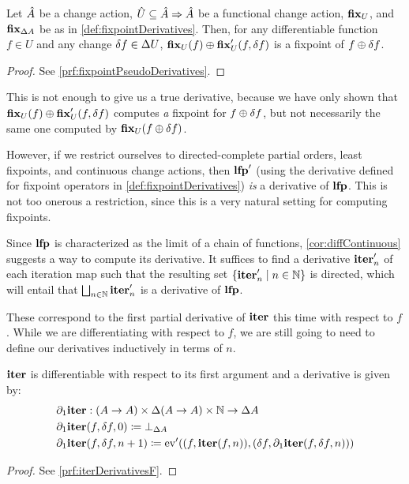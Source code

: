 \begin{thm}[name=Pseudo-derivatives of fixpoints, restate=fixpointPseudoDerivatives]
\label{thm:fixpointPseudoDerivatives}
  Let $\hat{A}$ be a change action, $\hat{U} \subseteq \hat{A} \Rightarrow
  \hat{A}$ be a functional change action, $\mathbf{fix}_{U}$, and 
  $\mathbf{fix}_{\Delta A}$ be as in \cref{def:fixpointDerivatives}. Then, for any
  differentiable function $f \in U$ and any change $\delta f \in \Delta U$,
  $\mathbf{fix}_U(f) \oplus \mathbf{fix}_U'(f, \delta f)$ is a fixpoint
  of $f \oplus \delta f$.
\end{thm}
\ifproofs
\begin{proof}
  See \cref{prf:fixpointPseudoDerivatives}.
\end{proof}
\fi

This is not enough to give us a true derivative, because we have only shown
that $\mathbf{fix}_U(f) \oplus \mathbf{fix}_U'(f, \delta f)$ computes \emph{a} 
fixpoint for $f \oplus \delta f$, but not necessarily
the same one computed by $\mathbf{fix}_U{(f \oplus \delta f)}$.

However, if we restrict ourselves to directed-complete partial orders, least
fixpoints, and continuous change actions, then $\mathbf{lfp}'$ (using the
derivative defined for fixpoint operators in \cref{def:fixpointDerivatives}) \emph{is} a
derivative of $\mathbf{lfp}$. This is not too onerous a restriction, since this is
a very natural setting for computing fixpoints.

Since $\mathbf{lfp}$ is characterized as the limit of a chain of functions,
\cref{cor:diffContinuous} suggests a way to compute its derivative. It suffices to find a derivative
$\mathbf{iter}_n'$ of each iteration map 
such that the resulting set $\{ \mathbf{iter}_n' \mid n \in \mathbb{N}\}$ is directed, 
which will entail that $\bigsqcup_{n \in \mathbb{N}}\mathbf{iter}_n'$ is a derivative of $\mathbf{lfp}$.

These correspond to the first partial derivative of $\mathbf{iter}$ \textemdash{} this time with respect to
$f$. While we are differentiating with respect to $f$, we are still going to
need to define our derivatives inductively in terms of $n$.

\begin{prop}[name=Derivative of the iteration map with respect to $f$, restate=iterDerivativesF]
  \label{prop:iterDerivativesF}
  $\mathbf{iter}$ is differentiable with respect to its first argument and a derivative is given by:
  \begin{align*}
    &\partial_1{\mathbf{iter}} : (A \rightarrow A) \times \Delta (A \rightarrow A) \times \mathbb{N} \rightarrow \Delta A\\
    &\partial_1{\mathbf{iter}} (f, \delta f, 0) \coloneqq \bot_{\Delta A}\\
    &\partial_1{\mathbf{iter}} (f, \delta f, n + 1) \coloneqq \operatorname{ev}'((f, \mathbf{iter}(f, n)), (\delta f, \partial_1{\mathbf{iter}}(f, \delta f, n)))
  \end{align*}
\end{prop}
\ifproofs
\begin{proof}
  See \cref{prf:iterDerivativesF}.
\end{proof}
\fi

